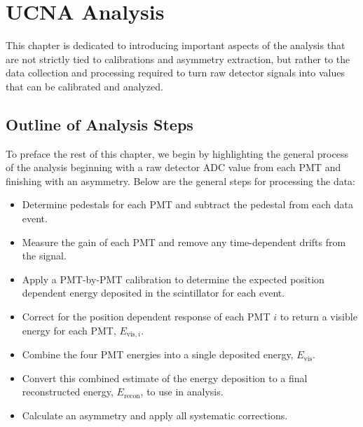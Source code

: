 \chapter{UCNA Analysis}
\label{ch:UCNA_Analysis}

This chapter is dedicated to introducing important aspects of the analysis that
are not strictly tied to calibrations and asymmetry extraction, but rather to the
data collection and processing required to turn raw detector signals into values that
can be calibrated and analyzed. 






\section{Outline of Analysis Steps} \label{sec:outline}

To preface the rest of this chapter, we begin by highlighting
the general process of the analysis beginning with a raw detector
ADC value from each PMT and finishing with an asymmetry.
Below are the general steps for processing the data:

\begin{itemize}
\item Determine pedestals for each PMT and subtract the pedestal from each data event.
\item Measure the gain of each PMT and remove any time-dependent drifts from the signal.
\item Apply a PMT-by-PMT calibration to determine the expected position dependent
  energy deposited in the scintillator
  for each event.
\item Correct for the position dependent response of each PMT $i$
  to return a visible energy for each PMT, $E_{\mathrm{vis},i}$.
\item Combine the four PMT energies into a single deposited energy, $E_{\mathrm{vis}}$.
\item Convert this combined estimate of the energy deposition to a final
  reconstructed energy, $E_{\mathrm{recon}}$, to use in analysis.
\item Calculate an asymmetry and apply all systematic corrections.
\end{itemize}

